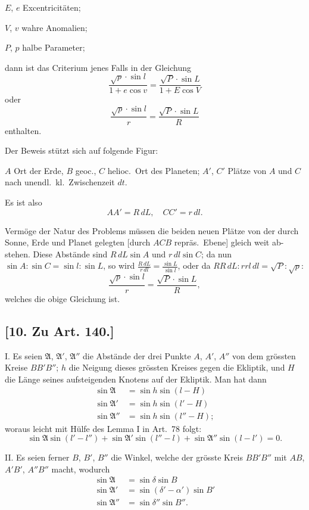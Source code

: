 \documentclass[12pt,a4paper]{article}
\begin{document}
$E$, $e$ Excentricit\"aten;

$V$, $v$ wahre Anomalien;

$P$, $p$ halbe Parameter;

dann ist das Criterium jenes Falls in der Gleichung
\[
\frac{\sqrt{p} \cdot \sin l}{1 + e\cos v} = \frac{\sqrt{P} \cdot \sin L}{1 + E\cos V}
\]
oder
\[
\frac{\sqrt{p} \cdot \sin l}{r} = \frac{\sqrt{P} \cdot \sin L}{R}
\]
enthalten.

\newpage

Der Beweis st\"utzt sich auf folgende Figur:

$A$ Ort der Erde, $B$ geoc., $C$ helioc.~Ort
des Planeten; $A'$, $C'$ Pl\"atze von $A$ und $C$ nach
unendl.~kl.~Zwischenzeit $dt$.

Es ist also
\[
AA' = R\,dL, \quad CC' = r\,dl.
\]

Verm\"oge der Natur des Problems m\"ussen die beiden neuen Pl\"atze von der durch
Sonne, Erde und Planet gelegten [durch $ACB$ repr\"as.~Ebene] gleich weit ab-
stehen. Diese Abst\"ande sind $R\,dL\sin A$ und $r\,dl\sin C$; da nun $\sin A : \sin C
= \sin l : \sin L$, so wird $\frac{R\,dL}{r\,dl} = \frac{\sin L}{\sin l}$, oder da $RR\,dL : rrl\,dl = \sqrt{P} : \sqrt{p}$:
\[
\frac{\sqrt{p} \cdot \sin l}{r} = \frac{\sqrt{P} \cdot \sin L}{R},
\]
welches die obige Gleichung ist.

\subsection*{[10. Zu Art. 140.]}

I. Es seien $\mathfrak{A}$, $\mathfrak{A}'$, $\mathfrak{A}''$ die Abst\"ande der drei Punkte $A$, $A'$, $A''$ von dem
gr\"ossten Kreise $BB'B''$; $h$ die Neigung dieses gr\"ossten Kreises gegen die
Ekliptik, und $H$ die L\"ange seines aufsteigenden Knotens auf der Ekliptik.
Man hat dann
\begin{align*}
\sin\mathfrak{A} &= \sin h \sin(l - H) \\
\sin\mathfrak{A}' &= \sin h \sin(l' - H) \\
\sin\mathfrak{A}'' &= \sin h \sin(l'' - H);
\end{align*}
woraus leicht mit H\"ulfe des Lemma I in Art.~78 folgt:
\begin{equation}\tag{1}
\sin\mathfrak{A}\sin(l' - l'') + \sin\mathfrak{A}'\sin(l'' - l) + \sin\mathfrak{A}''\sin(l - l') = 0.
\end{equation}

II. Es seien ferner $B$, $B'$, $B''$ die Winkel, welche der gr\"osste Kreis
$BB'B''$ mit $AB$, $A'B'$, $A''B''$ macht, wodurch
\begin{align*}
\sin\mathfrak{A} &= \sin\delta \sin B \\
\sin\mathfrak{A}' &= \sin(\delta' - \alpha')\sin B' \\
\sin\mathfrak{A}'' &= \sin\delta''\sin B''.
\end{align*}
\end{document}
